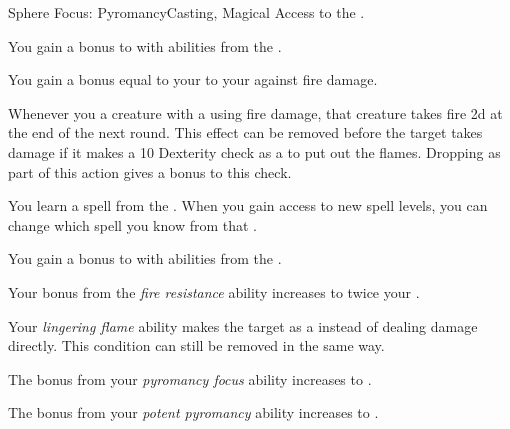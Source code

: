    \begin{feat}{Sphere Focus: Pyromancy}{Casting, Magical}
        \featpre Access to the  .

         You gain a  bonus to  with abilities from the  .

         You gain a bonus equal to your  to your  against fire damage.

         Whenever you  a creature with a  using fire damage, that creature takes fire  \minus2d at the end of the next round.
        This effect can be removed before the target takes damage if it makes a  10 Dexterity check as a  to put out the flames.
        Dropping  as part of this action gives a  bonus to this check.

         You learn a spell from the  .
        When you gain access to new spell levels, you can change which spell you know from that .

         You gain a  bonus to  with abilities from the  .

         Your bonus from the \textit{fire resistance} ability increases to twice your .

         Your \textit{lingering flame} ability makes the target  as a  instead of dealing damage directly.
        This condition can still be removed in the same way.

         The bonus from your \textit{pyromancy focus} ability increases to .

         The bonus from your \textit{potent pyromancy} ability increases to .
    \end{feat}

